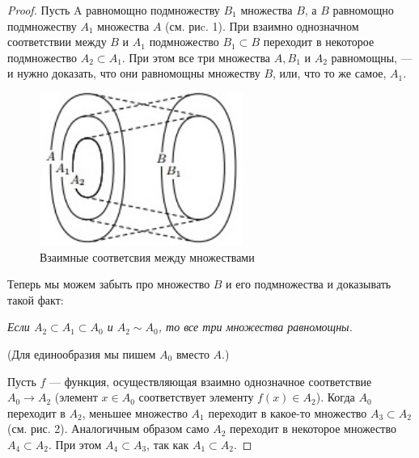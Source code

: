 \documentclass[a4paper, 12pt]{article}
\begin{document}
\begin{proof}
 
 
 Пусть A равномощно подмножеству $B_1$ множества $B$, а $B$ равномощно подмножеству $A_1$ множества $A$ (см. риc. 1). При взаимно однозначном соответствии между $B$ и $A_1$ подмножество $B_1 \subset B$ переходит в некоторое подмножество $A_2 \subset A_1$. При этом все три множества $A, B_1$ и $A_2$ равномощны, --- и нужно доказать, что они равномощны множеству $B$, или, что то же самое, $A_1$.
 
 \begin{figure}[h]
\begin{center}
\begin{minipage}[h]{0.4\linewidth}
 \includegraphics[height=5cm, width=\linewidth]{images/kantorbern1.jpg}
 \caption{Взаимные соответсвия между множествами}
 \end{minipage}
 \end{center}
 \end{figure}
 
 Теперь мы можем забыть про множество $B$ и его подмножества и доказывать такой факт:
 
 \textit{Если $A_2 \subset A_1 \subset A_0$ и $A_2 \sim A_0$, то все три множества
равномощны.}

 (Для единообразия мы пишем $A_0$ вместо $A$.)
 
 Пусть $f$ — функция, осуществляющая взаимно однозначное соответствие $A_0 \rightarrow A_2$ (элемент $x \in A_0$ соответствует элементу $f(x) \in A_2$). Когда $A_0$ переходит в $A_2$, меньшее множество $A_1$ переходит в какое-то множество $A_3 \subset A_2$ (см. рис. 2). Аналогичным образом само $A_2$ переходит в некоторое множество $A_4 \subset A_2$. При этом $A_4 \subset A_3$, так как $A_1 \subset A_2$.


\end{proof}
\end{document}
